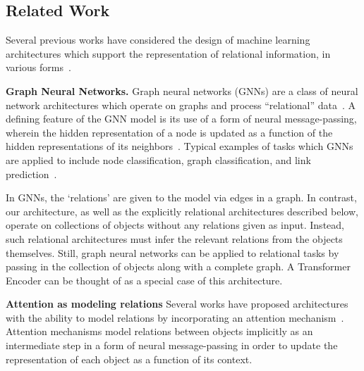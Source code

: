 \subsection{Related Work}

Several previous works have considered the design of machine learning architectures which support the representation of relational information, in various forms~\citep{battagliaRelationalInductiveBiases2018,palmRecurrentRelationalNetworks2018,zhangRAVENDatasetRelational2019}.

\textbf{Graph Neural Networks.} Graph neural networks (GNNs) are a class of neural network architectures which operate on graphs and process ``relational'' data~\citep{niepertLearningConvolutionalNeural2016,kipfSemiSupervisedClassificationGraph2017,schlichtkrullModelingRelationalData2017,velickovicGraphAttentionNetworks2017,kipfNeuralRelationalInference2018}. A defining feature of the GNN model is its use of a form of neural message-passing, wherein the hidden representation of a node is updated as a function of the hidden representations of its neighbors~\citep{gilmerNeuralMessagePassing2017}. Typical examples of tasks which GNNs are applied to include node classification, graph classification, and link prediction~\citep{hamiltonGraphRepresentationLearning2020}. %

In GNNs, the `relations' are given to the model via edges in a graph. In contrast, our architecture, as well as the explicitly relational architectures described below, operate on collections of objects without any relations given as input. Instead, such relational architectures must infer the relevant relations from the objects themselves. Still, graph neural networks can be applied to relational tasks by passing in the collection of objects along with a complete graph. A Transformer Encoder can be thought of as a special case of this architecture.%

\textbf{Attention as modeling relations} Several works have proposed architectures with the ability to model relations by incorporating an attention mechanism~\citep{vaswani2017attention,locatelloObjectCentricLearningSlot2020,santoroRelationalRecurrent2018,zambaldiDeepReinforcementLearning2018,velickovicGraphAttentionNetworks2017}. Attention mechanisms model relations between objects implicitly as an intermediate step in a form of neural message-passing in order to update the representation of each object as a function of its context.

